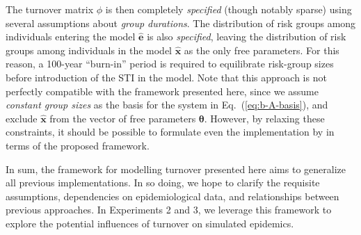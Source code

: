 The turnover matrix $\phi$ is then completely \emph{specified} (though notably sparse)
using several assumptions about \emph{group durations}.
The distribution of risk groups among individuals entering the model $\bm{\hat{e}}$
is also \emph{specified},
leaving the distribution of risk groups among individuals in the model $\bm{\hat{x}}$
as the only free parameters.
For this reason, a 100-year ``burn-in'' period is required
to equilibrate risk-group sizes before introduction of the STI in the model.
Note that this approach is not perfectly compatible with the framework presented here,
since we assume \emph{constant group sizes}
as the basis for the system in Eq.~(\ref{eq:b-A-basis}),
and exclude $\bm{\hat{x}}$ from the vector of free parameters $\bm{\theta}$.
However, by relaxing these constraints,
it should be possible to formulate even the implementation by \citet{Boily2015}
in terms of the proposed framework.
\par
In sum, the framework for modelling turnover presented here aims to generalize
all previous implementations.
In so doing, we hope to clarify the requisite assumptions,
dependencies on epidemiological data,
and relationships between previous approaches.
In Experiments 2 and 3, we leverage this framework to explore
the potential influences of turnover on simulated epidemics.
\color{black}